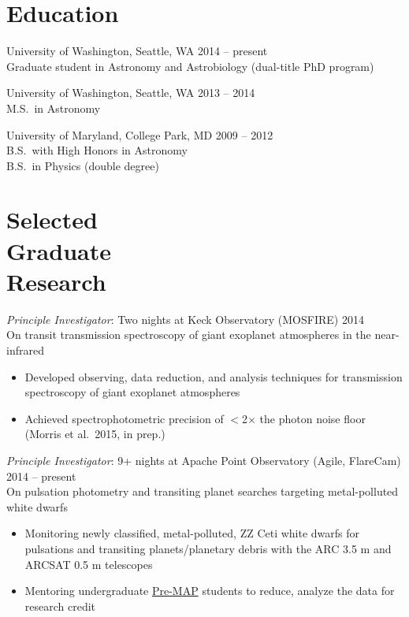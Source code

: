 \documentclass[margin]{res}
\begin{document}
\begin{resume}

\section{Education} 
University of Washington, Seattle, WA \hfill 2014 -- present\\
Graduate student in Astronomy and Astrobiology (dual-title PhD program)

University of Washington, Seattle, WA \hfill 2013 -- 2014\\
M.S.\ in Astronomy 

University of Maryland, College Park, MD  \hfill 2009 -- 2012\\
B.S.\ with High Honors in Astronomy \\
B.S.\ in Physics (double degree)\\

\section{Selected \\Graduate \\Research} 
                {\sl Principle Investigator}: Two nights at Keck Observatory (MOSFIRE)   \hfill          2014\\
                On transit transmission spectroscopy of giant exoplanet atmospheres in the near-infrared
                 \begin{itemize}  \itemsep -2pt %
                 \item Developed observing, data reduction, and analysis techniques for transmission spectroscopy of giant exoplanet atmospheres
                 \item Achieved spectrophotometric precision of $<$2$\times$ the photon noise floor  (Morris et al.~2015, in prep.)
                 \end{itemize}  

                {\sl Principle Investigator}: 9+ nights at Apache Point Observatory (Agile, FlareCam) \hfill          2014 -- present\\
                On pulsation photometry and transiting planet searches targeting metal-polluted white dwarfs
                 \begin{itemize}  \itemsep -1pt %
                 \item Monitoring newly classified, metal-polluted, ZZ Ceti white dwarfs for pulsations and transiting planets/planetary debris with the ARC 3.5 m and ARCSAT 0.5 m telescopes
                 \item Mentoring undergraduate \href{http://www.astro.washington.edu/users/premap/}{Pre-MAP} students to reduce, analyze the data for research credit\\
                 \end{itemize}  


\end{resume}
\end{document}
